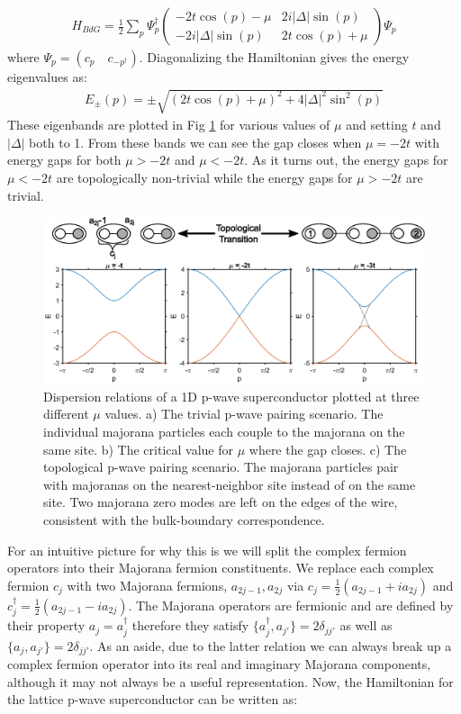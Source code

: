 \begin{align}
	H_{BdG} = \frac{1}{2}\sum_{p}\Psi_{p}^{\dagger}
	\begin{pmatrix}
		-2t\cos(p)-\mu & 2i|\Delta|\sin(p)\\
		-2i|\Delta|\sin(p) & 2t\cos(p)+\mu
	\end{pmatrix}
	\Psi_{p}
\end{align}
where $\Psi_{p}=(c_{p}\quad c_{-p^{\dagger}})$. Diagonalizing the Hamiltonian gives the energy eigenvalues as:
\begin{align}
	E_{\pm}(p) = \pm\sqrt{(2t\cos(p)+\mu)^{2}+4|\Delta|^{2}\sin^{2}(p)}
\end{align}
These eigenbands are plotted in Fig \ref{pwavesc} for various values of $\mu$ and setting $t$ and $|\Delta|$ both to 1. From these bands we can see the gap closes when $\mu=-2t$ with energy gaps for both $\mu>-2t$ and $\mu<-2t$. As it turns out, the energy gaps for $\mu < -2t$ are topologically non-trivial while the energy gaps for $\mu > -2t$ are trivial.
\begin{figure}
	\centering
	\includegraphics[width=\textwidth]{Intro/Figures/PWave_SC.eps}
	\caption{Dispersion relations of a 1D p-wave superconductor plotted at three different $\mu$ values. a) The trivial p-wave pairing scenario. The individual majorana particles each couple to the majorana on the same site. b) The critical value for $\mu$ where the gap closes. c) The topological p-wave pairing scenario. The majorana particles pair with majoranas on the nearest-neighbor site instead of on the same site. Two majorana zero modes are left on the edges of the wire, consistent with the bulk-boundary correspondence.}
	\label{pwavesc}
\end{figure}
For an intuitive picture for why this is we will split the complex fermion operators into their Majorana fermion constituents. We replace each complex fermion $c_{j}$ with two Majorana fermions, $a_{2j-1},a_{2j}$ via $c_{j}=\frac{1}{2}(a_{2j-1}+ia_{2j})$ and $c_{j}^{\dagger}=\frac{1}{2}(a_{2j-1}-ia_{2j})$. The Majorana operators are fermionic and are defined by their property $a_{j}=a_{j}^{\dagger}$ therefore they satisfy $\{a_{j}^{\dagger},a_{j'}\}=2\delta_{jj'}$ as well as $\{a_{j},a_{j'}\}=2\delta_{jj'}$. As an aside, due to the latter relation we can always break up a complex fermion operator into its real and imaginary Majorana components, although it may not always be a useful representation. Now, the Hamiltonian for the lattice p-wave superconductor can be written as:
